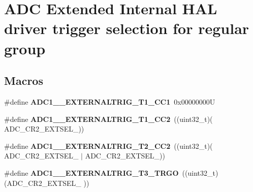 \hypertarget{group___a_d_c_ex___internal___h_a_l__driver___ext__trig__src___regular}{}\section{A\+DC Extended Internal H\+AL driver trigger selection for regular group}
\label{group___a_d_c_ex___internal___h_a_l__driver___ext__trig__src___regular}
\subsection*{Macros}
\begin{DoxyCompactItemize}
\item 
\mbox{\label{group___a_d_c_ex___internal___h_a_l__driver___ext__trig__src___regular_ga241251bb419e25ad3b7bf895c86e5510}} 
\#define {\bfseries A\+D\+C1\+\_\+\_\+\+E\+X\+T\+E\+R\+N\+A\+L\+T\+R\+I\+G\+\_\+\+T1\+\_\+\+C\+C1}~0x00000000U
\item 
\mbox{\label{group___a_d_c_ex___internal___h_a_l__driver___ext__trig__src___regular_gacae72c954c422badc90bb0b4d0d20815}} 
\#define {\bfseries A\+D\+C1\+\_\+\_\+\+E\+X\+T\+E\+R\+N\+A\+L\+T\+R\+I\+G\+\_\+\+T1\+\_\+\+C\+C2}~((uint32\+\_\+t)(                                      A\+D\+C\+\_\+\+C\+R2\+\_\+\+E\+X\+T\+S\+E\+L\+\_))
\item 
\mbox{\label{group___a_d_c_ex___internal___h_a_l__driver___ext__trig__src___regular_ga3f20bd007866e3f97a3eceacba8b9dab}} 
\#define {\bfseries A\+D\+C1\+\_\+\_\+\+E\+X\+T\+E\+R\+N\+A\+L\+T\+R\+I\+G\+\_\+\+T2\+\_\+\+C\+C2}~((uint32\+\_\+t)(                   A\+D\+C\+\_\+\+C\+R2\+\_\+\+E\+X\+T\+S\+E\+L\+\_ $\vert$ A\+D\+C\+\_\+\+C\+R2\+\_\+\+E\+X\+T\+S\+E\+L\+\_))
\item 
\mbox{\label{group___a_d_c_ex___internal___h_a_l__driver___ext__trig__src___regular_ga0ba310c2b48bef9a7efb244a057c743b}} 
\#define {\bfseries A\+D\+C1\+\_\+\_\+\+E\+X\+T\+E\+R\+N\+A\+L\+T\+R\+I\+G\+\_\+\+T3\+\_\+\+T\+R\+GO}~((uint32\+\_\+t)(A\+D\+C\+\_\+\+C\+R2\+\_\+\+E\+X\+T\+S\+E\+L\+\_                                      ))

\end{DoxyCompactItemize}
